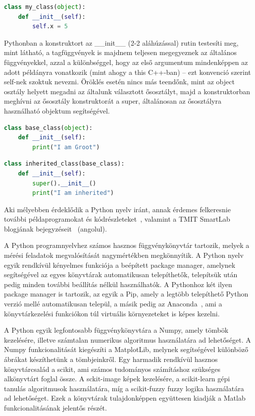 \documentclass[12pt,a4paper,oneside]{report}             %
\begin{document}
\begin{lstlisting}[language=Python]
class my_class(object):
	def __init__(self):
		self.x = 5
\end{lstlisting}

Pythonban a konstruktort az \_\_init\_\_ (2-2 aláhúzással) rutin testesíti meg, mint látható, a tagfüggvények is majdnem teljesen megegyeznek az általános függvényekkel, azzal a különbséggel, hogy az első argumentum mindenképpen az adott példányra vonatkozik (mint ahogy a this C++-ban) – ezt konvenció szerint self-nek szoktuk nevezni.
Öröklés esetén nincs más teendőnk, mint az object osztály helyett megadni az általunk választott ősosztályt, majd a konstruktorban meghívni az ősosztály konstruktorát a super, általánosan az ősosztályra használható objektum segítségével.

\begin{lstlisting}[language=Python]
class base_class(object):
	def __init__(self):
		print("I am Groot")
\end{lstlisting}

\begin{lstlisting}[language=Python]
class inherited_class(base_class):
	def __init__(self):
		super().__init__()
		print("I am inherited")
\end{lstlisting}

Aki mélyebben érdeklődik a Python nyelv iránt, annak érdemes felkeresnie további példaprogramokat és kódrészleteket~\cite{gist}, valamint a TMIT SmartLab blogjának bejegyzéseit~\cite{smart1,smart2} (angolul). 

A Python programnyelvhez számos hasznos függvénykönyvtár tartozik, melyek a mérési feladatok megvalósítását nagymértékben megkönnyítik. A Python nyelv egyik rendkívül kényelmes funkciója a beépített package manager, amelynek segítségével az egyes könyvtárak automatikusan telepíthetők, telepítsük után pedig minden további beállítás nélkül használhatók. A Pythonhoz két ilyen package manager is tartozik, az egyik a Pip, amely a legtöbb telepíthető Python verzió mellé automatikusan települ, a másik pedig az Anaconda~\cite{conda}, ami a könyvtárkezelési funkciókon túl virtuális környezeteket is képes kezelni.

A Python egyik legfontosabb függvénykönyvtára a Numpy, amely tömbök kezelésére, illetve számtalan numerikus algoritmus használatára ad lehetőséget. A Numpy funkcionalitását kiegészíti a MatplotLib, melynek segítségével különböző ábrákat készíthetünk a tömbjeinkről. Egy harmadik rendkívül hasznos könyvtárcsalád a scikit, ami számos tudományos számításhoz szükséges alkönyvtárt foglal össze. A sckit-image képek kezelésére, a scikit-learn gépi tanulás algoritmusok használatára, míg a scikit-fuzzy fuzzy logika használatára ad lehetőséget. Ezek a könyvtárak tulajdonképpen együttesen kiadják a Matlab funkcionalitásának jelentős részét.
\end{document}
